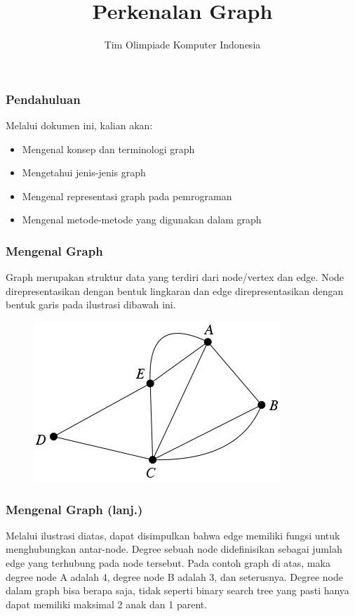 

\title{Perkenalan Graph}
\author{Tim Olimpiade Komputer Indonesia}
\date{}




\begin{frame}
\titlepage
\end{frame}

\begin{frame}
\frametitle{Pendahuluan}
Melalui dokumen ini, kalian akan:
\begin{itemize}
	\item Mengenal konsep dan terminologi graph
	\item Mengetahui jenis-jenis graph
	\item Mengenal representasi graph pada pemrograman
	\item Mengenal metode-metode yang digunakan dalam graph
\end{itemize}

\end{frame}

\begin{frame}
\frametitle{Mengenal Graph}
Graph merupakan struktur data yang terdiri dari \alert{node/vertex} dan \alert{edge}. Node direpresentasikan dengan bentuk lingkaran dan edge direpresentasikan dengan bentuk garis pada ilustrasi dibawah ini.

\begin{figure}
	\centering
	\includegraphics[width=6 cm]{asset/graph.jpg}
\end{figure}
\end{frame}

\begin{frame}
\frametitle{Mengenal Graph (lanj.)}
Melalui ilustrasi diatas, dapat disimpulkan bahwa edge memiliki fungsi untuk menghubungkan antar-node. \alert{Degree} sebuah node didefinisikan sebagai jumlah edge yang terhubung pada node tersebut.\newline\newline
Pada contoh graph di atas, maka degree node A adalah 4, degree node B adalah 3, dan seterusnya. Degree node dalam graph bisa berapa saja, tidak seperti binary search tree yang pasti hanya dapat memiliki maksimal 2 anak dan 1 parent. 
\end{frame}

